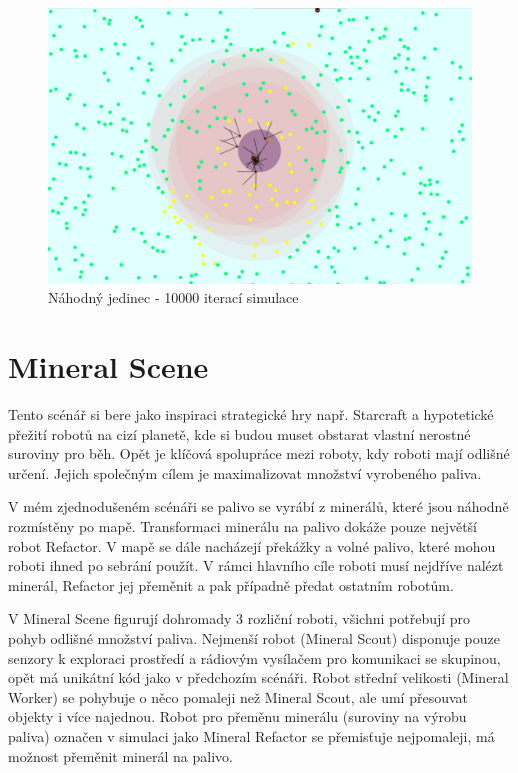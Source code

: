 	\begin{figure}[p]\centering
		\includegraphics[width=\columnwidth]{../img/WoodMap/pictures/EndRandom.png}
		\caption{Náhodný jedinec - 10000 iterací simulace}
		\label{obr04:randomEnd}
	\end{figure}
	\clearpage
\section{Mineral Scene}
Tento scénář si bere jako inspiraci strategické hry např. Starcraft \citep*{starcraft} a hypotetické přežití robotů na cizí planetě, kde si budou muset obstarat vlastní nerostné suroviny pro běh. Opět je klíčová spolupráce mezi roboty, kdy roboti mají odlišné určení. Jejich společným cílem je maximalizovat množství vyrobeného paliva.
\par 
V mém zjednodušeném scénáři se palivo se vyrábí z minerálů, které jsou náhodně rozmístěny po mapě. Transformaci minerálu na palivo dokáže pouze největší robot Refactor. V mapě se dále nacházejí překážky a volné palivo, které mohou roboti ihned po sebrání použít. V rámci hlavního cíle roboti musí nejdříve nalézt minerál, Refactor jej přeměnit a pak případně předat ostatním robotům. 
\par
V Mineral Scene figurují dohromady 3 rozliční roboti, všichni potřebují pro pohyb odlišné množství paliva. Nejmenší robot (Mineral Scout) disponuje pouze senzory k exploraci prostředí a rádiovým vysílačem pro komunikaci se skupinou, opět má unikátní kód  jako v předchozím scénáři. Robot střední velikosti (Mineral Worker) se pohybuje o něco pomaleji než Mineral Scout, ale umí přesouvat objekty i více najednou. Robot pro přeměnu minerálu (suroviny na výrobu paliva) označen v simulaci jako Mineral Refactor se přemisťuje nejpomaleji, má možnost přeměnit minerál na palivo. 
